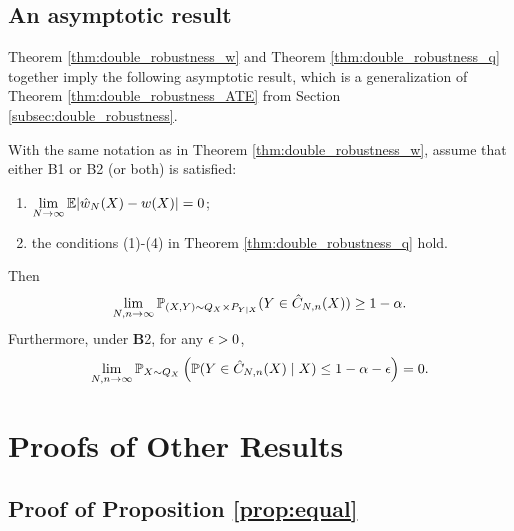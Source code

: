   \subsection{An asymptotic result}\label{subsec:asymptotic}

  Theorem \ref{thm:double_robustness_w} and Theorem \ref{thm:double_robustness_q} together imply the following asymptotic
  result, which is a generalization of Theorem
  \ref{thm:double_robustness_ATE} from Section
  \ref{subsec:double_robustness}.
\begin{corollary}\label{cor:double_robustness}
With the same notation as in Theorem \ref{thm:double_robustness_w}, assume
  that either B1 or B2 (or both) is satisfied:
  \begin{enumerate}[\textbf{B}1]
  \item $\displaystyle \lim_{N\rightarrow \infty}\E |\hat{w}_{N}(X) - w(X)| = 0$;
  \item the conditions (1)-(4) in Theorem \ref{thm:double_robustness_q} hold.
  \end{enumerate}
  Then
  \begin{equation}
    \label{eq:unconditional_coverage_general}
    \lim_{N, n\rightarrow\infty}\P_{(X, Y)\sim Q_{X}\times P_{Y\mid X}}(Y \in \hat{C}_{N, n}(X))\ge 1 - \alpha.
  \end{equation}
  Furthermore, under \textbf{B}2, for any $\eps > 0$,
    \begin{equation}
    \label{eq:conditional_coverage_general}
    \lim_{N, n\rightarrow\infty}\P_{X\sim Q_{X}}\lb \P(Y\in \hat{C}_{N, n}(X)\mid X)\le 1 - \alpha - \eps\rb = 0.
  \end{equation}
\end{corollary}

\section{Proofs of Other Results}\label{app:miscellaneous}
\subsection{Proof of Proposition \ref{prop:equal}}

